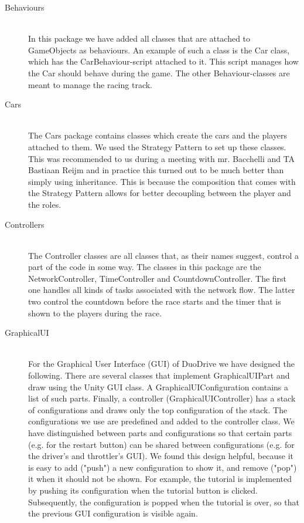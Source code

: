 \documentclass[11pt,twoside,a4paper]{article}
\begin{document}
\begin{description}
\item[Behaviours] \hfill \\
    In this package we have added all classes that are attached to GameObjects as behaviours. An example of such a class is the Car class, which has the CarBehaviour-script attached to it. This script manages how the Car should behave during the game. The other Behaviour-classes are meant to manage the racing track.
\item[Cars] \hfill \\
    The Cars package contains classes which create the cars and the players attached to them. We used the Strategy Pattern to set up these classes. This was recommended to us during a meeting with mr. Bacchelli and TA Bastiaan Reijm and in practice this turned out to be much better than simply using inheritance. This is because the composition that comes with the Strategy Pattern allows for better decoupling between the player and the roles.
    \newpage
\item[Controllers] \hfill \\
    The Controller classes are all classes that, as their names suggest, control a part of the code in some way. The classes in this package are the NetworkController, TimeController and CountdownController. The first one handles all kinds of tasks associated with the network flow. The latter two control the countdown before the race starts and the timer that is shown to the players during the race.
\item[GraphicalUI] \hfill \\
    For the Graphical User Interface (GUI) of DuoDrive we have designed the following. There are several classes that implement GraphicalUIPart and draw using the Unity GUI class. A GraphicalUIConfiguration contains a list of such parts. Finally, a controller (GraphicalUIController) has a stack of configurations and draws only the top configuration of the stack.
\newline\newline
The configurations we use are predefined and added to the controller class. We have distinguished between parts and configurations so that certain parts (e.g. for the restart button) can be shared between configurations (e.g. for the driver's and throttler's GUI).
\newline\newline
We found this design helpful, because it is easy to add ("push") a new configuration to show it, and remove ("pop") it when it should not be shown. For example, the tutorial is implemented by pushing its configuration when the tutorial button is clicked. Subsequently, the configuration is popped when the tutorial is over, so that the previous GUI configuration is visible again.

\end{description}
\end{document}
